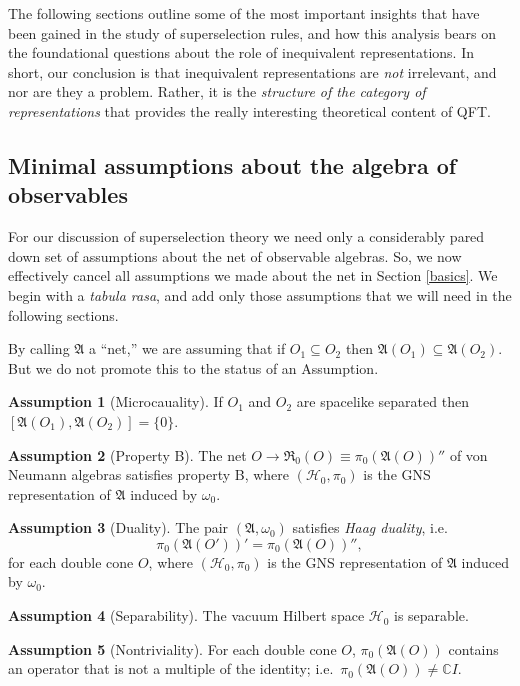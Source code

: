 \documentclass[11pt]{article}
\newenvironment{bxd}%
  {\bigskip\noindent\begin{Sbox}\begin{minipage}{0.9\textwidth} }%
  {\end{minipage}\end{Sbox}\fbox{\TheSbox}\bigskip}%
\newcommand{\alg}[1]{\mathfrak{#1}}
\theoremstyle{definition}
\newtheorem{assumption}{Assumption}
\theoremstyle{definition}
\theoremstyle{remark}
\def\2#1{{\mathcal #1}}
\def\7#1{{\mathbb #1}}
\def\al#1{{\mathfrak #1}}
\def\om{\omega} \def\Om{\Omega} \def\dd{\partial} \def\D{\Delta}
\begin{document}
The following sections outline some of the most important insights
that have been gained in the study of superselection rules, and how
this analysis bears on the foundational questions about the role of
inequivalent representations.  In short, our conclusion is that
inequivalent representations are \emph{not} irrelevant, and nor are
they a problem.  Rather, it is the \emph{structure of the category of
  representations} that provides the really interesting theoretical
content of QFT.

\subsection{Minimal assumptions about the algebra of observables} \label{proto-DHR}

For our discussion of superselection theory we need only a
considerably pared down set of assumptions about the net of observable
algebras.  So, we now effectively cancel all assumptions we made about
the net in Section \ref{basics}.  We begin with a \emph{tabula rasa},
and add only those assumptions that we will need in the following
sections.

\setcounter{assumption}{0} 

By calling $\al A$ a ``net,'' we are assuming that if $O_1\subseteq
O_2$ then $\al A(O_1)\subseteq \al A(O_2)$.  But we do not promote
this to the status of an Assumption.

\begin{bxd}
\begin{assumption}[Microcauality] If $O_1$ and $O_2$ are spacelike
  separated then $[\alg{A}(O_1),\alg{A}(O_2)]=\{ 0\}$.
\end{assumption}
\begin{assumption}[Property B] The net $O\to \alg{R}_0(O)\equiv \pi
  _0(\alg{A}(O))''$ of von Neumann algebras satisfies property B,
  where $(\2H _0,\pi _0)$ is the GNS representation of $\alg{A}$
  induced by $\om _0$.
  \label{borchers}
\end{assumption}
\begin{assumption}[Duality] The pair $(\alg{A},\om _0)$ satisfies
  \emph{Haag duality}, i.e.\
  $$ \pi _0(\alg{A}(O'))'=\pi _0(\alg{A}(O))'' ,$$ for each double cone $O$, where
  $(\2H _0 ,\pi _0)$ is the GNS representation of $\alg{A}$ induced by
  $\omega _0$.
\end{assumption}
\begin{assumption}[Separability] The vacuum Hilbert space $\2H _0$ is
  separable.  \end{assumption}
\begin{assumption}[Nontriviality] For each double cone $O$, $\pi
  _0(\alg{A}(O))$ contains an operator that is not a multiple of the
  identity; i.e.\ $\pi _0(\alg{A}(O))\neq \7C I$.
  \label{nontrivial}
\end{assumption} \end{bxd}
\end{document}
